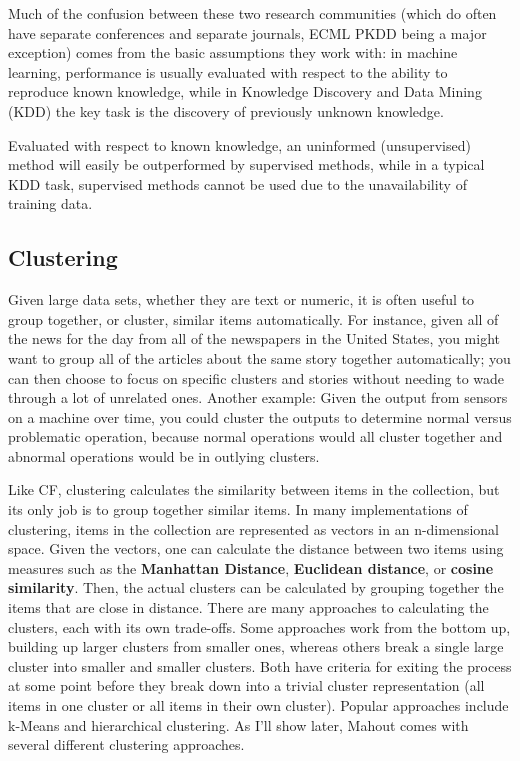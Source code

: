 \documentclass[12pt]{article}
\begin{document}
Much of the confusion between these two research communities (which do often have separate conferences and separate journals, ECML PKDD being a major exception) comes from the basic assumptions they work with: in machine learning, performance is usually evaluated with respect to the ability to reproduce known knowledge, while in Knowledge Discovery and Data Mining (KDD) the key task is the discovery of previously unknown knowledge.

Evaluated with respect to known knowledge, an uninformed (unsupervised) method will easily be outperformed by supervised methods, while in a typical KDD task, supervised methods cannot be used due to the unavailability of training data.
\subsection{Clustering}
Given large data sets, whether they are text or numeric, it is often useful to group together, or cluster, similar items automatically. For instance, given all of the news for the day from all of the newspapers in the United States, you might want to group all of the articles about the same story together automatically; you can then choose to focus on specific clusters and stories without needing to wade through a lot of unrelated ones. Another example: Given the output from sensors on a machine over time, you could cluster the outputs to determine normal versus problematic operation, because normal operations would all cluster together and abnormal operations would be in outlying clusters.

Like CF, clustering calculates the similarity between items in the collection, but its only job is to group together similar items. In many implementations of clustering, items in the collection are represented as vectors in an n-dimensional space. Given the vectors, one can calculate the distance between two items using measures such as the \textbf{Manhattan Distance}, \textbf{Euclidean distance}, or \textbf{cosine similarity}. Then, the actual clusters can be calculated by grouping together the items that are close in distance.
There are many approaches to calculating the clusters, each with its own trade-offs. Some approaches work from the bottom up, building up larger clusters from smaller ones, whereas others break a single large cluster into smaller and smaller clusters. Both have criteria for exiting the process at some point before they break down into a trivial cluster representation (all items in one cluster or all items in their own cluster). Popular approaches include k-Means and hierarchical clustering. As I'll show later, Mahout comes with several different clustering approaches.
\end{document}
